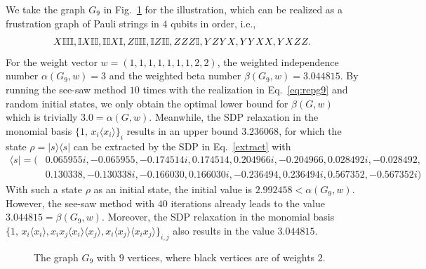 We take the graph $G_9$ in Fig.~\ref{fig:HCRfeyz} for the illustration, which can be realized as a frustration graph of Pauli strings in $4$ qubits in order, i.e.,
\begin{equation}\label{eq:repg9}
    X\mathbb{I}\mathbb{I}\mathbb{I}, \mathbb{I} X\mathbb{I}\mathbb{I}, \mathbb{I}\mathbb{I} X\mathbb{I}, Z\mathbb{I}\mathbb{I}\mathbb{I}, \mathbb{I} Z\mathbb{I}\mathbb{I}, ZZZ\mathbb{I}, YZYX, YYXX, YXZZ.
\end{equation}
For the weight vector $w = (1,1,1,1,1,1,1,2,2)$, the weighted independence number $\alpha(G_9,w) = 3$ and the weighted beta number $\beta(G_9,w) = 3.044815$. By running the see-saw method $10$ times with the realization in Eq.~\eqref{eq:repg9} and random initial states, we only obtain the optimal lower bound for $\beta(G,w)$ which is trivially $3.0 = \alpha(G,w)$. Meanwhile, the SDP relaxation in the monomial basis $\{1,\,x_{i}\langle x_{i}\rangle\}_i$ results in an upper bound $3.236068$, for which the state $\rho = |s\rangle\langle s|$ can be extracted by the SDP in Eq.~\eqref{extract} with 
\begin{align}
\langle s| = (
& 0.065955i, -0.065955, -0.174514i, 0.174514, 0.204966i, -0.204966, 0.028492i, -0.028492,\nonumber\\ &  0.130338, -0.130338i, -0.166030, 0.166030i, -0.236494, 0.236494i, 0.567352, -0.567352i)
\end{align}
With such a state $\rho$ as an initial state, the initial value is $2.992458 < \alpha(G_9,w)$. However, the see-saw method with $40$ iterations already leads to the value $3.044815 = \beta(G_9,w)$. Moreover, the SDP relaxation in the monomial basis $\{1,\,x_{i}\langle x_{i}\rangle,x_{i}x_{j}\langle x_{i}\rangle\langle x_{j}\rangle,x_{i}\langle x_{j}\rangle\langle x_{i}x_{j}\rangle\}_{i,j}$ also results in the value $3.044815$.
\begin{figure}
\centering
{}
\caption{The graph $G_{9}$ with $9$ vertices, where black vertices are of weights $2$.}
\label{fig:HCRfeyz}
\end{figure}

